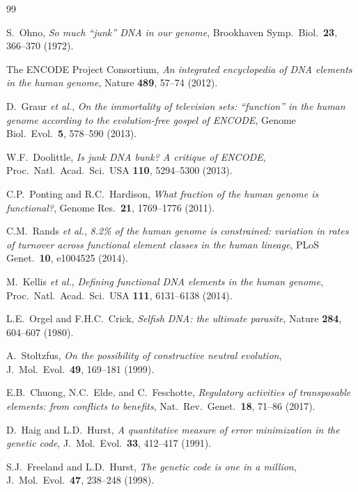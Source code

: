 \documentclass[11pt,a4paper]{article}
\begin{document}
\begin{thebibliography}{99}

S.~Ohno, \emph{So much ``junk'' DNA in our genome}, Brookhaven Symp.\ Biol.\ \textbf{23}, 366--370 (1972).

The ENCODE Project Consortium, \emph{An integrated encyclopedia of DNA elements in the human genome}, Nature \textbf{489}, 57--74 (2012).

D.~Graur \emph{et al.}, \emph{On the immortality of television sets: ``function'' in the human genome according to the evolution-free gospel of ENCODE}, Genome Biol.\ Evol.\ \textbf{5}, 578--590 (2013).

W.F.~Doolittle, \emph{Is junk DNA bunk? A critique of ENCODE}, Proc.\ Natl.\ Acad.\ Sci.\ USA \textbf{110}, 5294--5300 (2013).

C.P.~Ponting and R.C.~Hardison, \emph{What fraction of the human genome is functional?}, Genome Res.\ \textbf{21}, 1769--1776 (2011).

C.M.~Rands \emph{et al.}, \emph{8.2\% of the human genome is constrained: variation in rates of turnover across functional element classes in the human lineage}, PLoS Genet.\ \textbf{10}, e1004525 (2014).

M.~Kellis \emph{et al.}, \emph{Defining functional DNA elements in the human genome}, Proc.\ Natl.\ Acad.\ Sci.\ USA \textbf{111}, 6131--6138 (2014).

L.E.~Orgel and F.H.C.~Crick, \emph{Selfish DNA: the ultimate parasite}, Nature \textbf{284}, 604--607 (1980).

A.~Stoltzfus, \emph{On the possibility of constructive neutral evolution}, J.\ Mol.\ Evol.\ \textbf{49}, 169--181 (1999).

E.B.~Chuong, N.C.~Elde, and C.~Feschotte, \emph{Regulatory activities of transposable elements: from conflicts to benefits}, Nat.\ Rev.\ Genet.\ \textbf{18}, 71--86 (2017).

D.~Haig and L.D.~Hurst, \emph{A quantitative measure of error minimization in the genetic code}, J.\ Mol.\ Evol.\ \textbf{33}, 412--417 (1991).

S.J.~Freeland and L.D.~Hurst, \emph{The genetic code is one in a million}, J.\ Mol.\ Evol.\ \textbf{47}, 238--248 (1998).


\end{thebibliography}
\end{document}
